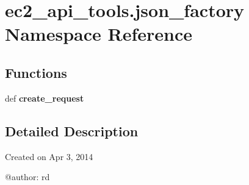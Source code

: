 \hypertarget{namespaceec2__api__tools_1_1json__factory}{\section{ec2\-\_\-api\-\_\-tools.\-json\-\_\-factory Namespace Reference}
\label{namespaceec2__api__tools_1_1json__factory}
}
\subsection*{Functions}
\begin{DoxyCompactItemize}
\item 
\hypertarget{namespaceec2__api__tools_1_1json__factory_a02e32b1c563fdb1e1e177ceb3e6195c0}{def {\bfseries create\-\_\-request}}\label{namespaceec2__api__tools_1_1json__factory_a02e32b1c563fdb1e1e177ceb3e6195c0}

\end{DoxyCompactItemize}


\subsection{Detailed Description}
\begin{DoxyVerb}Created on Apr 3, 2014

@author: rd
\end{DoxyVerb}
 